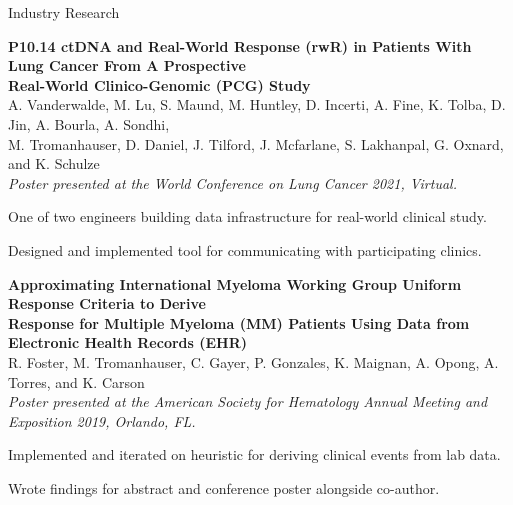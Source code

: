 \documentclass{resume} %
\begin{document}
\begin{grouping}{Industry Research}

\item {\bf P10.14 ctDNA and Real-World Response (rwR) in Patients With Lung Cancer From A Prospective} \\
    {\bf Real-World Clinico-Genomic (PCG) Study} \\
    A. Vanderwalde, M. Lu, S. Maund, M. Huntley, D. Incerti, A. Fine, K. Tolba, D. Jin, A.
    Bourla, A. Sondhi, \\
    M. Tromanhauser, D. Daniel, J. Tilford, J. Mcfarlane, S. Lakhanpal, G. Oxnard,
    and K. Schulze \\
    {\em Poster presented at the World Conference on Lung Cancer 2021, Virtual.}
    \begin{items}
        \item One of two engineers building data infrastructure for real-world clinical study.
        \item Designed and implemented tool for communicating with participating clinics.
    \end{items}
\hspace{5mm}

\item {\bf Approximating International Myeloma Working Group Uniform Response Criteria to Derive} \\
    {\bf Response for Multiple Myeloma (MM) Patients Using Data from Electronic Health
    Records (EHR)} \\
    R. Foster, M. Tromanhauser, C. Gayer, P. Gonzales, K. Maignan, A. Opong, A. Torres, and K. Carson \\
    {\em Poster presented at the American Society for Hematology Annual Meeting and Exposition
    2019, Orlando, FL.}
    \begin{items}
        \item Implemented and iterated on heuristic for deriving clinical events from lab data.
        \item Wrote findings for abstract and conference poster alongside co-author.
    \end{items}
\hspace{5mm}


\end{grouping}
\end{document}
